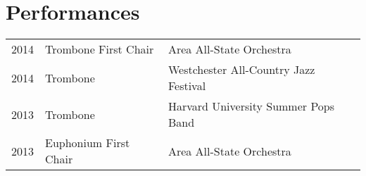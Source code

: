 \documentclass[letterpaper]{deedy-resume} %
\begin{document}
\begin{minipage}[t]{0.58\textwidth}
\section{Performances} 

\begin{tabular}{rll}
2014 & Trombone First Chair & Area All-State Orchestra \\
2014 & Trombone & Westchester All-Country Jazz Festival \\
2013 & Trombone & Harvard University Summer Pops Band \\
2013 & Euphonium First Chair & Area All-State Orchestra \\
\end{tabular}

\sectionspace %


\end{minipage} %








\end{document}
